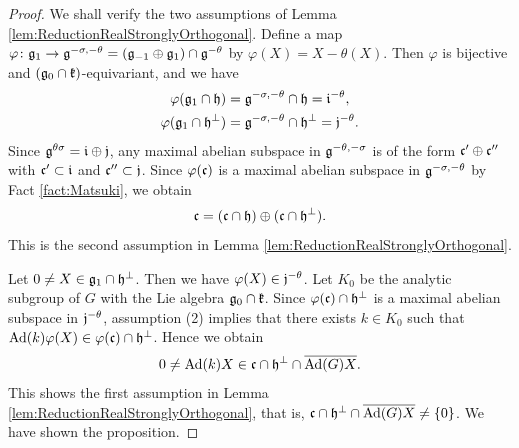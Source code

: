 \begin{proof}
	We shall verify the two assumptions of Lemma \ref{lem:ReductionRealStronglyOrthogonal}.
	Define a map $\varphi \colon \mathfrak{g}_1 \rightarrow \mathfrak{g}^{-\sigma, -\theta} = (\mathfrak{g}_{-1} \oplus \mathfrak{g}_{1}) \cap \mathfrak{g}^{-\theta}$ by $\varphi(X) = X - \theta(X)$.
	Then $\varphi$ is bijective and $(\mathfrak{g}_0\cap \mathfrak{k})$-equivariant, and we have
	\begin{align*}
		\varphi(\mathfrak{g}_1 \cap \mathfrak{h}) &= \mathfrak{g}^{-\sigma, -\theta} \cap \mathfrak{h} = \mathfrak{i}^{-\theta}, \\
		\varphi(\mathfrak{g}_1 \cap \mathfrak{h}^\perp) &= \mathfrak{g}^{-\sigma, -\theta} \cap \mathfrak{h}^\perp = \mathfrak{j}^{-\theta}.
	\end{align*}
	Since $\mathfrak{g}^{\theta\sigma} = \mathfrak{i} \oplus \mathfrak{j}$, any maximal abelian subspace in $\mathfrak{g}^{-\theta, -\sigma}$ is of the form $\mathfrak{c}' \oplus \mathfrak{c}''$ with $\mathfrak{c}' \subset \mathfrak{i}$ and $\mathfrak{c}'' \subset \mathfrak{j}$.
	Since $\varphi(\mathfrak{c})$ is a maximal abelian subspace in $\mathfrak{g}^{-\sigma, -\theta}$ by Fact \ref{fact:Matsuki}, we obtain 
	\begin{align*}
		\mathfrak{c} = (\mathfrak{c} \cap \mathfrak{h}) \oplus (\mathfrak{c} \cap \mathfrak{h}^\perp).
	\end{align*}
	This is the second assumption in Lemma \ref{lem:ReductionRealStronglyOrthogonal}.

	Let $0\neq X \in \mathfrak{g}_1 \cap \mathfrak{h}^\perp$.
	Then we have $\varphi(X) \in \mathfrak{j}^{-\theta}$.
	Let $K_0$ be the analytic subgroup of $G$ with the Lie algebra $\mathfrak{g}_0\cap \mathfrak{k}$.
	Since $\varphi(\mathfrak{c}) \cap \mathfrak{h}^\perp$ is a maximal abelian subspace in $\mathfrak{j}^{-\theta}$, assumption (2) implies that there exists $k \in K_0$ such that $\mathrm{Ad}(k)\varphi(X) \in \varphi(\mathfrak{c}) \cap \mathfrak{h}^\perp$.
	Hence we obtain
	\begin{align*}
		0\neq \mathrm{Ad}(k)X \in \mathfrak{c} \cap \mathfrak{h}^\perp \cap \overline{\mathrm{Ad}(G)X}.
	\end{align*}
	This shows the first assumption in Lemma \ref{lem:ReductionRealStronglyOrthogonal}, that is, $\mathfrak{c} \cap \mathfrak{h}^\perp \cap \overline{\mathrm{Ad}(G)X} \neq \left\{0 \right\}$.
	We have shown the proposition.
\end{proof}
